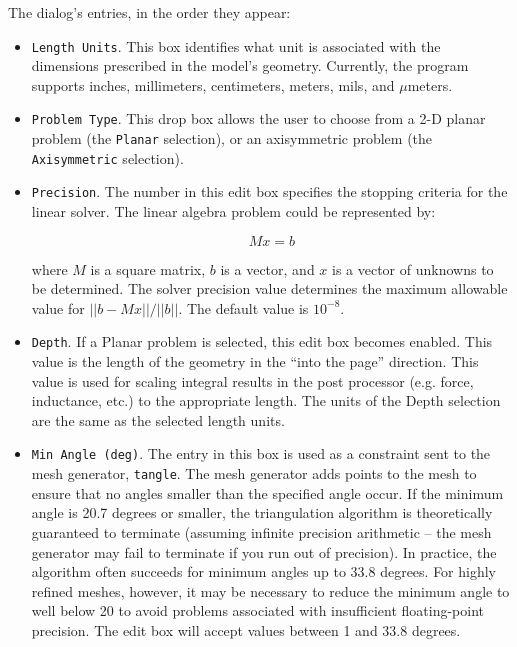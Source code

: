 \documentclass[12pt]{report}
\begin{document}
The dialog's entries, in the order they appear:

\begin{itemize}

\item{\tt Length Units}. This box identifies
what unit is associated with the dimensions prescribed in the
model's geometry. Currently, the program supports inches,
millimeters, centimeters, meters, mils, and $\mu $meters.

\item{\tt Problem Type}. This
drop box allows the user to choose from a 2-D planar problem (the
\texttt{Planar} selection), or an axisymmetric problem (the
\texttt{Axisymmetric} selection).

\item{\tt Precision}. The
number in this edit box specifies the stopping criteria for the
linear solver. The linear algebra problem could be represented by:

\begin{displaymath}
M x = b
\end{displaymath}

\noindent
where $M$ is a square matrix, $b$ is a vector, and $x$ is a vector of
unknowns to be determined. The solver precision value determines the maximum
allowable value for $\vert \vert b - Mx\vert \vert / \vert \vert b\vert
\vert $. The default value is $10^{ - 8}$.

\item{\tt Depth}. If a Planar
problem is selected, this edit box becomes enabled. This value is
the length of the geometry in the ``into the page'' direction. This
value is used for scaling integral results in the post processor
(e.g. force, inductance, etc.) to the appropriate length. The units
of the Depth selection are the same as the selected length units.

\item{\tt Min Angle (deg)}.  The entry in this box is used as a
constraint sent to the mesh generator, {\tt tangle}.  The mesh generator
adds points to the mesh to
ensure that no angles smaller than the specified angle occur. If the minimum angle
is 20.7 degrees or smaller, the triangulation algorithm is theoretically guaranteed to
terminate (assuming infinite precision arithmetic -- the mesh generator may
fail to terminate if you run out of precision).  In practice, the
algorithm often succeeds for minimum angles up to 33.8 degrees.
For highly refined meshes, however, it may be necessary to reduce
the minimum angle to well below 20 to avoid problems associated
with insufficient floating-point precision.  The edit box will accept
values between 1 and 33.8 degrees.


\end{itemize}
\end{document}
